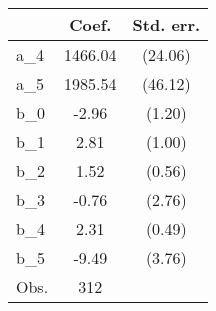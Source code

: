 {
\def\sym#1{\ifmmode^{#1}\else\(^{#1}\)\fi}
\begin{tabular}{l*{1}{cc}}
\hline\hline
                &    Coef.&Std. err.\\
\hline
a\_4             &  1466.04&  (24.06)\\
a\_5             &  1985.54&  (46.12)\\
b\_0             &    -2.96&   (1.20)\\
b\_1             &     2.81&   (1.00)\\
b\_2             &     1.52&   (0.56)\\
b\_3             &    -0.76&   (2.76)\\
b\_4             &     2.31&   (0.49)\\
b\_5             &    -9.49&   (3.76)\\
\hline
Obs.            &      312&         \\
\hline\hline
\end{tabular}
}
